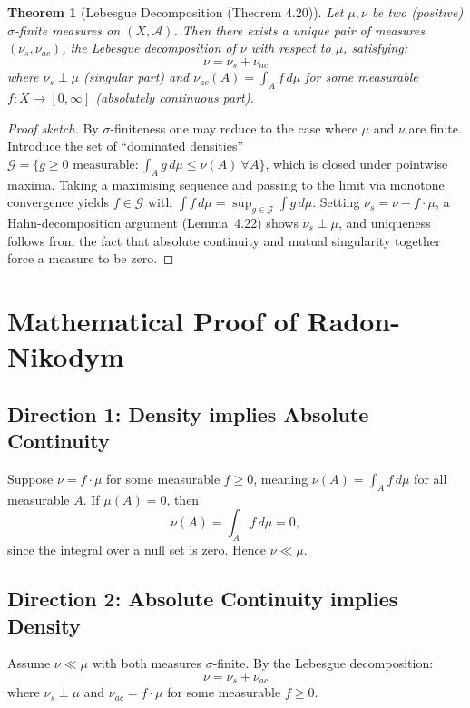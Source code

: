 \documentclass[11pt]{article}
\newtheorem{theorem}{Theorem}
\begin{document}
\begin{theorem}[Lebesgue Decomposition (Theorem 4.20)]
Let $\mu, \nu$ be two (positive) $\sigma$-finite measures on $(X, \mathcal{A})$. Then there exists a unique pair of measures $(\nu_s, \nu_{ac})$, the \emph{Lebesgue decomposition} of $\nu$ with respect to $\mu$, satisfying:
\[
\nu = \nu_s + \nu_{ac}
\]
where $\nu_s \perp \mu$ (singular part) and $\nu_{ac}(A) = \int_A f \, d\mu$ for some measurable $f : X \to [0, \infty]$ (absolutely continuous part).
\end{theorem}

\begin{proof}[Proof sketch]
By $\sigma$-finiteness one may reduce to the case where $\mu$ and $\nu$ are finite. Introduce the set of ``dominated densities'' $\mathcal{G} = \{g \geq 0 \text{ measurable} : \int_A g \, d\mu \leq \nu(A)\ \forall A\}$, which is closed under pointwise maxima. Taking a maximising sequence and passing to the limit via monotone convergence yields $f \in \mathcal{G}$ with $\int f\, d\mu = \sup_{g \in \mathcal{G}} \int g\, d\mu$. Setting $\nu_s = \nu - f \cdot \mu$, a Hahn-decomposition argument (Lemma~4.22) shows $\nu_s \perp \mu$, and uniqueness follows from the fact that absolute continuity and mutual singularity together force a measure to be zero.
\end{proof}

\section{Mathematical Proof of Radon-Nikodym}

\subsection*{Direction 1: Density implies Absolute Continuity}

Suppose $\nu = f \cdot \mu$ for some measurable $f \geq 0$, meaning $\nu(A) = \int_A f \, d\mu$ for all measurable $A$. If $\mu(A) = 0$, then
\[
\nu(A) = \int_A f \, d\mu = 0,
\]
since the integral over a null set is zero. Hence $\nu \ll \mu$.

\subsection*{Direction 2: Absolute Continuity implies Density}

Assume $\nu \ll \mu$ with both measures $\sigma$-finite. By the Lebesgue decomposition:
\[
\nu = \nu_s + \nu_{ac}
\]
where $\nu_s \perp \mu$ and $\nu_{ac} = f \cdot \mu$ for some measurable $f \geq 0$.
\end{document}
